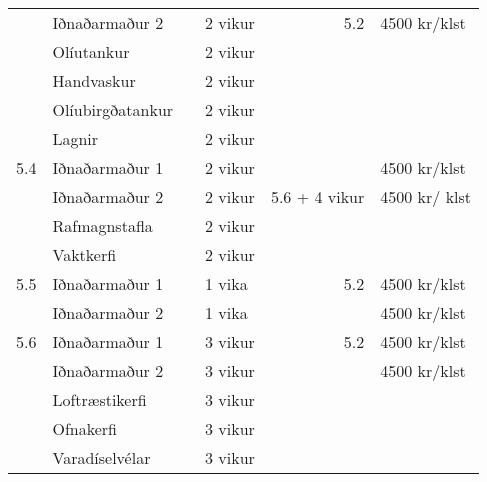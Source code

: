 \documentclass[11pt]{article}
\begin{document}
\begin{center}
\begin{tabular}{rlllrl}
             &  Iðnaðarmaður 2        &           &  2 vikur   &            5.2  &  4500 kr/klst                      \\
             &  Olíutankur            &           &  2 vikur   &                 &                                    \\
             &  Handvaskur            &           &  2 vikur   &                 &                                    \\
             &  Olíubirgðatankur      &           &  2 vikur   &                 &                                    \\
             &  Lagnir                &           &  2 vikur   &                 &                                    \\
\hline
        5.4  &  Iðnaðarmaður 1        &           &  2 vikur   &                 &  4500 kr/klst                      \\
             &  Iðnaðarmaður 2        &           &  2 vikur   &  5.6 + 4 vikur  &  4500 kr/ klst                     \\
             &  Rafmagnstafla         &           &  2 vikur   &                 &                                    \\
             &  Vaktkerfi             &           &  2 vikur   &                 &                                    \\
\hline
        5.5  &  Iðnaðarmaður 1        &           &  1 vika    &            5.2  &  4500 kr/klst                      \\
             &  Iðnaðarmaður 2        &           &  1 vika    &                 &  4500 kr/klst                      \\
\hline
        5.6  &  Iðnaðarmaður 1        &           &  3 vikur   &            5.2  &  4500 kr/klst                      \\
             &  Iðnaðarmaður 2        &           &  3 vikur   &                 &  4500 kr/klst                      \\
             &  Loftræstikerfi        &           &  3 vikur   &                 &                                    \\
             &  Ofnakerfi             &           &  3 vikur   &                 &                                    \\
             &  Varadíselvélar        &           &  3 vikur   &                 &                                    \\
\hline

\end{tabular}
\end{center}
\end{document}
